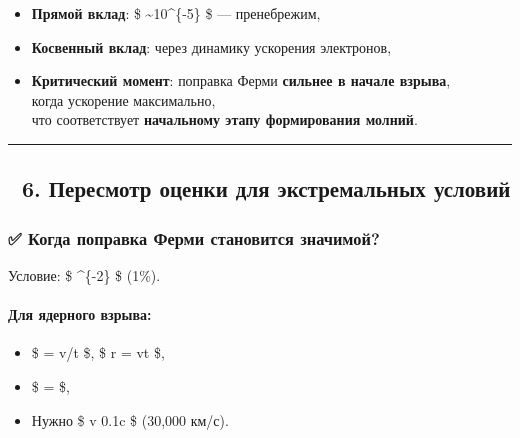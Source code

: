 \documentclass[11pt]{article}
\providecommand{\tightlist}{%
      \setlength{\itemsep}{0pt}\setlength{\parskip}{0pt}}
\begin{document}
\begin{itemize}
\tightlist
\item
  \textbf{Прямой вклад}: \$ \sim 10\^{}\{-5\} \$ --- пренебрежим,
\item
  \textbf{Косвенный вклад}: через динамику ускорения электронов,
\item
  \textbf{Критический момент}: поправка Ферми \textbf{сильнее в начале
  взрыва},\\
  когда ускорение максимально,\\
  что соответствует \textbf{начальному этапу формирования молний}.
\end{itemize}

\begin{center}\rule{0.5\linewidth}{\linethickness}\end{center}

\subsection{🔹 6. Пересмотр оценки для экстремальных
условий}\label{ux43fux435ux440ux435ux441ux43cux43eux442ux440-ux43eux446ux435ux43dux43aux438-ux434ux43bux44f-ux44dux43aux441ux442ux440ux435ux43cux430ux43bux44cux43dux44bux445-ux443ux441ux43bux43eux432ux438ux439}

\subsubsection{✅ Когда поправка Ферми становится
значимой?}\label{ux43aux43eux433ux434ux430-ux43fux43eux43fux440ux430ux432ux43aux430-ux444ux435ux440ux43cux438-ux441ux442ux430ux43dux43eux432ux438ux442ux441ux44f-ux437ux43dux430ux447ux438ux43cux43eux439}

Условие: \$  \^{}\{-2\} \$ (1\%).

\paragraph{Для ядерного
взрыва:}\label{ux434ux43bux44f-ux44fux434ux435ux440ux43dux43eux433ux43e-ux432ux437ux440ux44bux432ux430}

\begin{itemize}
\tightlist
\item
  \$ \Gamma = v/t \$, \$ r = vt \$,
\item
  \$  =  \$,
\item
  Нужно \$ v \gtrsim 0.1c \$ (30,000 км/с).
\end{itemize}
\end{document}
